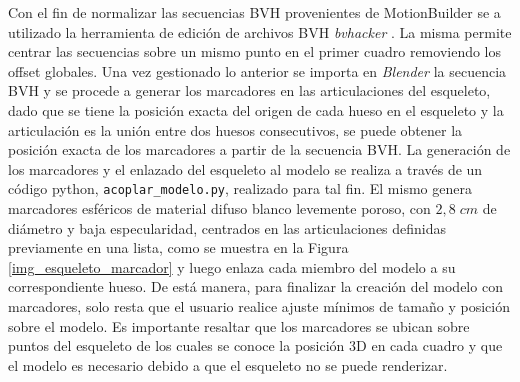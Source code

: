  Con el fin de normalizar las secuencias BVH provenientes de MotionBuilder se a utilizado la herramienta de edición de archivos BVH \textit{bvhacker} \cite{bvhacker}.
 La misma permite centrar las secuencias sobre un mismo punto en el primer cuadro removiendo los offset globales.
 Una vez gestionado lo anterior se importa en \textit{Blender} la secuencia BVH y se procede a generar los marcadores en las articulaciones del esqueleto, dado que se tiene la posición exacta del origen de cada hueso en el esqueleto y la articulación es la unión entre dos huesos consecutivos, se puede obtener la posición exacta de los marcadores a partir de la secuencia BVH.
 La generación de los marcadores y el enlazado del esqueleto al modelo se realiza a través de un código python, \texttt{acoplar\_modelo.py}, realizado para tal fin. El mismo genera marcadores esféricos de material difuso blanco levemente poroso, con $2,8 \;cm$ de diámetro y baja especularidad, centrados en las articulaciones definidas previamente en una lista, como se muestra en la Figura \ref{img_esqueleto_marcador} y luego enlaza cada miembro del modelo a su correspondiente hueso. De está manera, para finalizar la creación del modelo con marcadores, solo resta que el usuario realice ajuste mínimos de tamaño y posición sobre el modelo. Es importante resaltar que los marcadores se ubican sobre puntos del esqueleto de los cuales se conoce la posición 3D en cada cuadro y que el modelo es necesario debido a que el esqueleto no se puede renderizar. 
 
